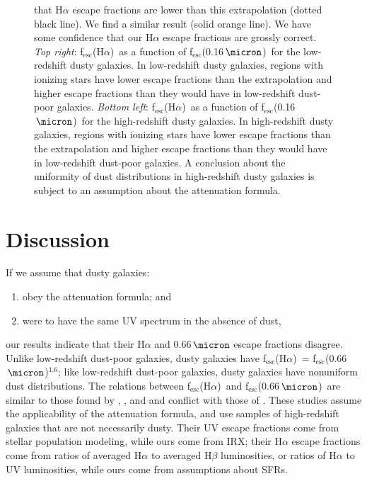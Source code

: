 \documentclass[preprint]{aastex}
\newcommand{\alephuv}{f$_{\mathrm{esc}}$(0.16$\,\micron$)}
\newcommand{\alephha}{f$_{\mathrm{esc}}$(H$\alpha$)}
\newcommand{\alephuvha}{f$_{\mathrm{esc}}$(0.66$\,\micron$)}
\begin{document}
\begin{figure}[!ht]
{{that H$\alpha$ escape fractions are lower than this extrapolation (dotted black
line).  We find a similar result (solid orange line).
We have some confidence that our H$\alpha$ escape fractions are grossly
correct.
\emph{Top right}:  \alephha~as a function of \alephuv~for the low-redshift dusty
galaxies.  In
low-redshift dusty galaxies, regions with ionizing stars have lower
escape fractions than the extrapolation and higher escape fractions than they
would have in low-redshift dust-poor galaxies.
\emph{Bottom left}:  \alephha~as a function of \alephuv~for the high-redshift
dusty galaxies.  In high-redshift dusty galaxies,
regions with ionizing stars have
lower escape fractions than the extrapolation and higher escape fractions than
they would have in low-redshift dust-poor galaxies.  A conclusion about the
uniformity of dust distributions in high-redshift dusty galaxies is subject to
an assumption about the attenuation formula.\label{fha_fuv}}}
\end{figure}

\section{Discussion}\label{sec:discuss}

If we assume that dusty galaxies:
\begin{enumerate}
\item obey the \citet{calzetti00} attenuation formula; and
\item were to have the same UV spectrum in the absence of dust,
\end{enumerate}
our results indicate that their H$\alpha$ and 0.66$\,\micron$ escape
fractions disagree.  Unlike low-redshift dust-poor galaxies, dusty galaxies
have \alephha~= \alephuvha$^{1.6}$; like low-redshift dust-poor galaxies,
dusty galaxies have nonuniform dust distributions.  The relations between
\alephha~and \alephuvha~are similar to those found by \citet{onodera10},
\citet{kashino13}, and \citet{price13} and conflict with those of
\citet{erb06}.  These studies assume the applicability of the \citet{calzetti00}
attenuation
formula, and use samples of high-redshift galaxies that are not necessarily
dusty.  Their UV escape fractions come from stellar population modeling, while
ours come from IRX; their H$\alpha$ escape fractions come from ratios of
averaged H$\alpha$ to averaged H$\beta$ luminosities, or ratios of H$\alpha$ to
UV luminosities, while ours come from assumptions about SFRs.
\end{document}
